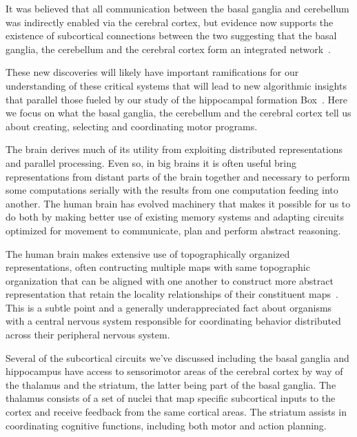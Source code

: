 It was believed that all communication between the basal ganglia and cerebellum was indirectly enabled via the cerebral cortex, but evidence now supports the existence of subcortical connections between the two suggesting that the basal ganglia, the cerebellum and the cerebral cortex form an integrated network~\cite{BostanandStrickNATURE-REVIEWS-NEUROSCIENCE-18}.

These new discoveries will likely have important ramifications for our understanding of these critical systems that will lead to new algorithmic insights that parallel those fueled by our study of the hippocampal formation Box~. Here we focus on what the basal ganglia, the cerebellum and the cerebral cortex tell us about creating, selecting and coordinating motor programs.


The brain derives much of its utility from exploiting distributed representations and parallel processing. Even so, in big brains it is often useful bring representations from distant parts of the brain together and necessary to perform some computations serially with the results from one computation feeding into another. The human brain has evolved machinery that makes it possible for us to do both by making better use of existing memory systems and adapting circuits optimized for movement to communicate, plan and perform abstract reasoning.

The human brain makes extensive use of topographically organized representations, often contructing multiple maps with same topographic organization that can be aligned with one another to construct more abstract representation that retain the locality relationships of their constituent maps~\cite{WandelletalNEURON-07,WandelletalPTRS-B-05}. This is a subtle point and a generally underappreciated fact about organisms with a central nervous system responsible for coordinating behavior distributed across their peripheral nervous system. 

Several of the subcortical circuits we've discussed including the basal ganglia and hippocampus have access to sensorimotor areas of the cerebral cortex by way of the thalamus and the striatum, the latter being part of the basal ganglia. The thalamus consists of a set of nuclei that map specific subcortical inputs to the cortex and receive feedback from the same cortical areas. The striatum assists in coordinating cognitive functions, including both motor and action planning.

